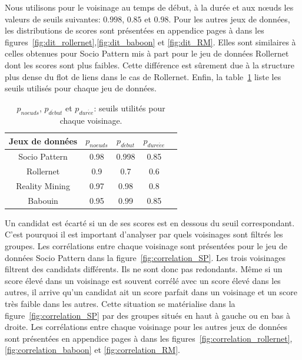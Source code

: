 
Nous utilisons pour le voisinage au temps de début, à la durée et aux n\oe{}uds les valeurs de seuils suivantes: $0.998$, $0.85$ et $0.98$.
Pour les autres jeux de données, les distributions de scores sont présentées en appendice pages \pageref{fig:dit_rollernet} à \pageref{fig:dit_RM} dans les figures~\ref{fig:dit_rollernet},\ref{fig:dit_baboon} et \ref{fig:dit_RM}.
Elles sont similaires à celles obtenues pour Socio Pattern mis à part pour le jeu de données Rollernet dont les scores sont plus faibles.
Cette différence est sûrement due à la structure plus dense du flot de liens dans le cas de Rollernet.
Enfin, la table~\ref{tab:thresholds} liste les seuils utilisés pour chaque jeu de données.
\begin{table}
\centering
\begin{tabular}{|c|c|c|c|c|}
\hline \rule[-1ex]{0pt}{3.5ex}
Jeux de données & $p_{noeuds}$ & $p_{d\acute{e}but}$  & $p_{dure\acute{e}e}$  \\
\hline
Socio Pattern & 0.98 & 0.998 & 0.85 \\
Rollernet& 0.9 & 0.7 & 0.6 \\
Reality Mining & 0.97  & 0.98 & 0.8 \\
Babouin & 0.95  &  0.99  & 0.85 \\
\hline
\end{tabular}
\caption{$p_{noeuds}$, $p_{d\acute{e}but}$ et  $p_{dur\acute{e}e}$: seuils utilités pour chaque voisinage.}
\label{tab:thresholds}       %
\end{table}

Un candidat est écarté si un de ses scores est en dessous du seuil correspondant. 
C'est pourquoi il est important d'analyser par quels voisinages sont filtrés les groupes.
Les corrélations entre chaque voisinage sont présentées pour le jeu de données Socio Pattern dans la figure~\ref{fig:correlation_SP}.
Les trois voisinages filtrent des candidats différents.
Ils ne sont donc pas redondants.
Même si un score élevé dans un voisinage est souvent corrélé avec un score élevé dans les autres, il arrive qu'un candidat ait un score parfait dans un voisinage et un score très faible dans les autres.
Cette situation se matérialise dans la figure~\ref{fig:correlation_SP} par des groupes situés en haut à gauche ou en bas à droite.
Les corrélations entre chaque voisinage pour les autres jeux de données sont présentées en appendice pages \pageref{fig:correlation_rollernet} à \pageref{fig:correlation_RM} dans les figures~\ref{fig:correlation_rollernet},\ref{fig:correlation_baboon} et \ref{fig:correlation_RM}.


